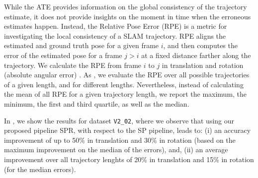 

\label{ssec:relative_pose_error}
While the ATE provides information on the global consistency of the trajectory estimate, it does not provide insights on the moment in time when the erroneous estimates happen.
Instead, the Relative Pose Error (RPE) is a metric for investigating the local consistency of a SLAM trajectory.
RPE aligns the estimated and ground truth pose for a given frame $i$, and then computes the error of the estimated pose for a frame $j>i$ at a fixed distance farther along the trajectory.
We calculate the RPE from frame $i$ to $j$ in translation and rotation (absolute angular error) \cite[Sec. 4.2.3]{RosinolMT}.
As \cite{Geiger12cvpr}, we evaluate the RPE over all possible trajectories of a given length, and for different lengths.
Nevertheless, instead of calculating the mean of all RPE for a given trajectory length, we report the maximum, the minimum, the first and third quartile, as well as the median.

In , we show the results for dataset \texttt{V2\_02}, where we observe that using our proposed pipeline SPR, with respect to the SP pipeline, leads to: (i) an accuracy improvement of up to 50\% in translation and 30\% in rotation (based on the maximum improvement on the median of the errors), and, (ii) an average improvement over all trajectory lenghts of 20\% in translation and 15\% in rotation (for the median errors).

